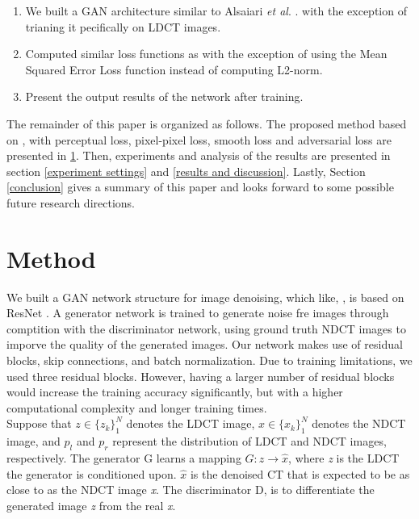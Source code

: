 \documentclass[journal]{IEEEtran}
\begin{document}
	\begin{enumerate}
		\item We built a GAN architecture similar to Alsaiari \emph{et al}. \cite{alsaiari2019image}. with the exception of trianing it pecifically on LDCT images.
		\item Computed similar loss functions as \cite{alsaiari2019image} with the exception of using the Mean Squared Error Loss function instead of computing L2-norm.
		\item Present the output results of the network after training.
	\end{enumerate}
	
	The remainder of this paper is organized as follows.  The proposed method based on \cite{alsaiari2019image}, with perceptual loss, pixel-pixel loss, smooth loss and adversarial loss are presented in \ref{method}.  Then, experiments and analysis of the results are presented in section \ref{experiment settings} and \ref{results and discussion}.  Lastly, Section \ref{conclusion} gives a summary of this paper and looks forward to some possible future research directions.

\section{Method}
\label{method}
	We built a GAN network structure for image denoising, which like, \cite{alsaiari2019image}, is based on ResNet \cite{he2016deep}.  A generator network is trained to generate noise fre images through comptition with the discriminator network, using ground truth NDCT images to imporve the quality of the generated images.  Our network makes use of residual blocks, skip connections, and batch normalization.  Due to training limitations, we used three residual blocks.  However, having a larger number of residual blocks would increase the training accuracy significantly, but with a higher computational complexity and longer training times.\\
	Suppose that $z \in \{z_k\}_1^N$ denotes the LDCT image, $x \in \{x_k\}_1^N$ denotes the NDCT image, and $p_l$ and $p_r$ represent the distribution of LDCT and NDCT images, respectively.  The generator G learns a mapping $G: z \rightarrow \hat{x}$, where \emph{z} is the LDCT the generator is conditioned upon.  $\hat{x}$ is the denoised CT that is expected to be as close to as the NDCT image \emph{x}.  The discriminator D, is to differentiate the generated image \emph{z} from the real \emph{x}.  
	
\end{document}
